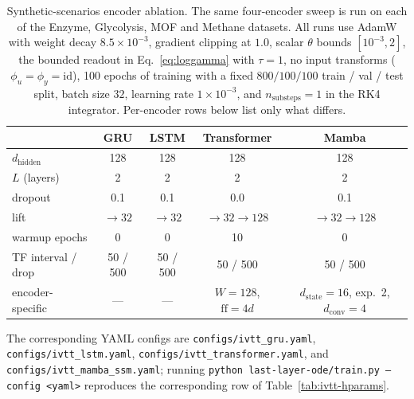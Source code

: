 \begin{table}[h]
\centering
\caption{Synthetic-scenarios encoder ablation. The same four-encoder sweep
is run on each of the Enzyme, Glycolysis, MOF and Methane datasets. All
runs use AdamW with weight decay $8.5\!\times\!10^{-3}$, gradient clipping
at $1.0$, scalar $\theta$ bounds $[10^{-3}, 2]$, the bounded readout in
Eq.~\ref{eq:loggamma} with $\tau\!=\!1$, no input transforms
($\phi_u\!=\!\phi_y\!=\!\mathrm{id}$), 100 epochs of training with a
fixed $800/100/100$ train / val / test split, batch size $32$,
learning rate $1\!\times\!10^{-3}$, and $n_{\mathrm{substeps}}\!=\!1$ in the
RK4 integrator. Per-encoder rows below list only what differs.}
\label{tab:synthetic_hparams}
\small
\begin{tabular}{lcccc}
\hline
                     & GRU                     & LSTM                & Transformer                                & Mamba \\
\hline
$d_{\mathrm{hidden}}$ & 128                    & 128                 & 128                                        & 128 \\
$L$ (layers)         & 2                       & 2                   & 2                                          & 2 \\
dropout              & 0.1                     & 0.1                 & 0.0                                        & 0.1 \\
lift                 & $\to\!32$               & $\to\!32$           & $\to\!32\!\to\!128$                        & $\to\!32\!\to\!128$ \\
warmup epochs        & 0                       & 0                   & 10                                         & 0 \\
TF interval / drop   & 50 / 500                & 50 / 500            & 50 / 500                                   & 50 / 500 \\
encoder-specific     & ---                     & ---                 & $W\!=\!128$, $\mathrm{ff}\!=\!4d$          & $d_{\mathrm{state}}\!=\!16$, exp.\ 2, $d_{\mathrm{conv}}\!=\!4$ \\
\hline
\end{tabular}
\end{table}

The corresponding YAML configs are
\texttt{configs/ivtt\_gru.yaml}, \texttt{configs/ivtt\_lstm.yaml},
\texttt{configs/ivtt\_transformer.yaml}, and
\texttt{configs/ivtt\_mamba\_ssm.yaml}; running
\texttt{python last-layer-ode/train.py --config <yaml>} reproduces the
corresponding row of Table~\ref{tab:ivtt-hparams}.
